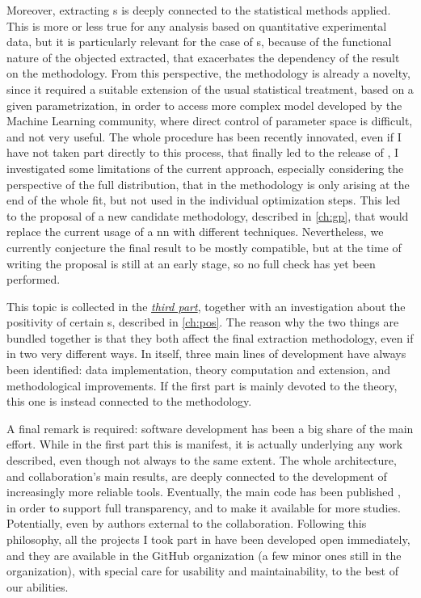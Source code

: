 Moreover, extracting \pdf{}s is deeply connected to the statistical methods
applied.
This is more or less true for any analysis based on quantitative experimental
data, but it is particularly relevant for the case of \pdf{}s, because of the
functional nature of the objected extracted, that exacerbates the dependency of
the result on the methodology.
From this perspective, the \nnpdf methodology is already a novelty, since it
required a suitable extension of the usual statistical treatment, based on a
given parametrization, in order to access more complex model developed by the
Machine Learning community, where direct control of parameter space is
difficult, and not very useful.
The whole procedure has been recently innovated, even if I have not taken part
directly to this process, that finally led to the release of 
\cite{NNPDF:2021njg}, I investigated some limitations of the current approach,
especially considering the perspective of the full distribution, that in the
\nnpdf methodology is only arising at the end of the whole fit, but not used in
the individual optimization steps.
This led to the proposal of a new candidate methodology, described in
\cref{ch:gp}, that would replace the current usage of a \acrfull{nn} with
different techniques.
Nevertheless, we currently conjecture the final result to be mostly compatible,
but at the time of writing the proposal is still at an early stage, so no full
check has yet been performed.

This topic is collected in the \hyperref[part:meth]{\textit{third part}},
together with an investigation about the positivity of certain \pdf{}s,
described in \cref{ch:pos}.
The reason why the two things are bundled together is that they both affect the
final extraction methodology, even if in two very different ways.
In \nnpdf itself, three main lines of development have always been identified:
data implementation, theory computation and extension, and methodological
improvements.
If the first part is  mainly devoted to the theory, this one is instead
connected to the methodology.

A final remark is required: software development has been a big share of the
main effort.
While in the first part this is manifest, it is actually underlying any work
described, even though not  always to the same extent.
The whole \nnpdf architecture, and collaboration's main results, are deeply
connected to the development of increasingly more reliable tools.
Eventually, the main code has been published \cite{NNPDF:2021uiq}, in order to
support full transparency, and to make it available for more studies.
Potentially, even by authors external to the collaboration.
Following this philosophy, all the projects I took part in have been developed
open immediately, and they are available in the  GitHub
organization (a few minor ones still in the  organization), with
special care for usability and maintainability, to the best of our abilities.
